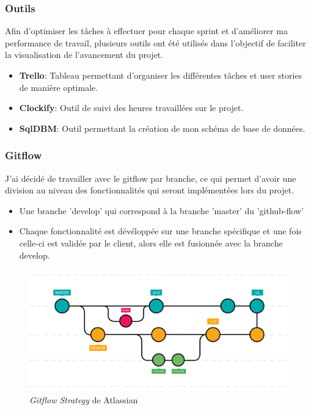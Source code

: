 \subsubsection{Outils}
Afin d'optimiser les tâches à effectuer pour chaque sprint et d'améliorer ma performance de travail, plusieurs outils ont été utilisés dans l'objectif de faciliter la visualisation de l’avancement du projet.
\begin{itemize}
  \item \textbf{Trello}: Tableau permettant d'organiser les différentes tâches et user stories de manière optimale.
  \item \textbf{Clockify}: Outil de suivi des heures travaillées sur le projet.
  \item \textbf{SqlDBM}: Outil permettant la création de mon schéma de base de données.
\end{itemize}

\subsubsection{Gitflow}

J'ai décidé de travailler avec le gitflow par branche, ce qui permet d'avoir une division au niveau des fonctionnalités qui seront implémentées lors du projet.

\begin{itemize}
  \item Une branche 'develop' qui correspond à la branche 'master' du 'github-flow'
  \item Chaque fonctionnalité est dévéloppée sur une branche spécifique et une fois celle-ci est validée par le client, alors elle est fusionnée avec la branche develop.
\end{itemize}

\begin{figure}[H]
  \centering
  \includegraphics[width=0.75\linewidth]{img/gitflow.png}
  \caption{ \textit{Gitflow Strategy} de Atlassian}
  \label{Gitflow}
\end{figure}


